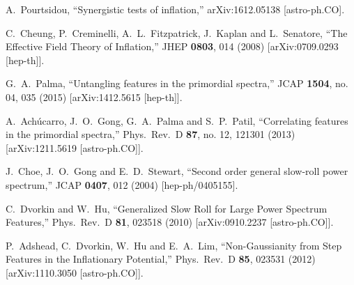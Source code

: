 \documentclass[12pt]{article}
\begin{document}
\begin{thebibliography}{99}
  A.~Pourtsidou,
  ``Synergistic tests of inflation,''
  arXiv:1612.05138 [astro-ph.CO].
  

  C.~Cheung, P.~Creminelli, A.~L.~Fitzpatrick, J.~Kaplan and L.~Senatore,
  ``The Effective Field Theory of Inflation,''
  JHEP {\bf 0803}, 014 (2008)
  [arXiv:0709.0293 [hep-th]].
  
  
  
  
  
  G.~A.~Palma,
  ``Untangling features in the primordial spectra,''
  JCAP {\bf 1504}, no. 04, 035 (2015)
  [arXiv:1412.5615 [hep-th]].

  
  A.~Ach\'ucarro, J.~O.~Gong, G.~A.~Palma and S.~P.~Patil,
  ``Correlating features in the primordial spectra,''
  Phys.\ Rev.\ D {\bf 87}, no. 12, 121301 (2013)
  [arXiv:1211.5619 [astro-ph.CO]].
  
  
  
  J.~Choe, J.~O.~Gong and E.~D.~Stewart,
  ``Second order general slow-roll power spectrum,''
  JCAP {\bf 0407}, 012 (2004)
  [hep-ph/0405155].
  
  
  
  C.~Dvorkin and W.~Hu,
  ``Generalized Slow Roll for Large Power Spectrum Features,''
  Phys.\ Rev.\ D {\bf 81}, 023518 (2010)
  [arXiv:0910.2237 [astro-ph.CO]].


  P.~Adshead, C.~Dvorkin, W.~Hu and E.~A.~Lim,
  ``Non-Gaussianity from Step Features in the Inflationary Potential,''
  Phys.\ Rev.\ D {\bf 85}, 023531 (2012)
  [arXiv:1110.3050 [astro-ph.CO]].




\end{thebibliography}
\end{document}
